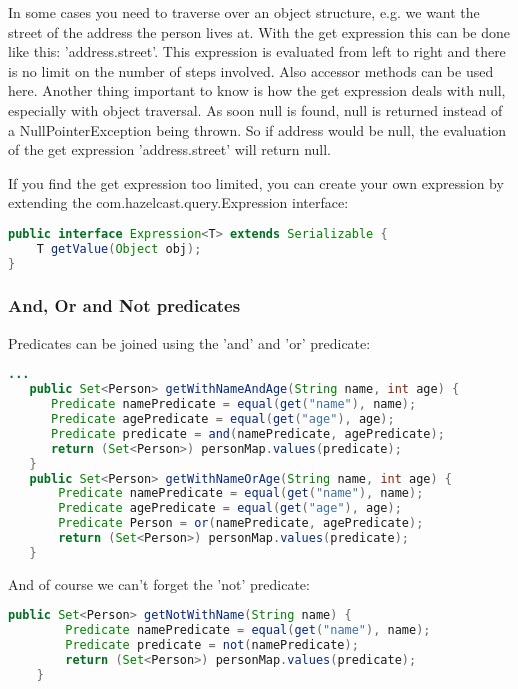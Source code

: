 In some cases you need to traverse over an object structure, e.g. we want the street of the address the person lives at. With the get expression this can be done like this: 'address.street'. This expression is evaluated from left to right and there is no limit on the number of steps involved. Also accessor methods can be used here. Another thing important to know is how the get expression deals with null, especially with object traversal. As soon null is found, null is returned instead of a NullPointerException being thrown. So if address would be null, the evaluation of the get expression 'address.street' will return null.

If you find the get expression too limited, you can create your own expression by extending the com.hazelcast.query.Expression interface:
\begin{lstlisting}[language=java]
public interface Expression<T> extends Serializable {
    T getValue(Object obj);
}
\end{lstlisting}

\subsubsection*{And, Or and Not predicates}
Predicates can be joined using the 'and' and 'or' predicate:
\begin{lstlisting}[language=java]
   ...
   public Set<Person> getWithNameAndAge(String name, int age) {
      Predicate namePredicate = equal(get("name"), name);
      Predicate agePredicate = equal(get("age"), age);
      Predicate predicate = and(namePredicate, agePredicate);
      return (Set<Person>) personMap.values(predicate);
   }
   public Set<Person> getWithNameOrAge(String name, int age) {
       Predicate namePredicate = equal(get("name"), name);
       Predicate agePredicate = equal(get("age"), age);
       Predicate Person = or(namePredicate, agePredicate);
       return (Set<Person>) personMap.values(predicate);
   }
\end{lstlisting}
And of course we can't forget the 'not' predicate:
\begin{lstlisting}[language=java]
    public Set<Person> getNotWithName(String name) {
        Predicate namePredicate = equal(get("name"), name);
        Predicate predicate = not(namePredicate);
        return (Set<Person>) personMap.values(predicate);
    }
\end{lstlisting}

